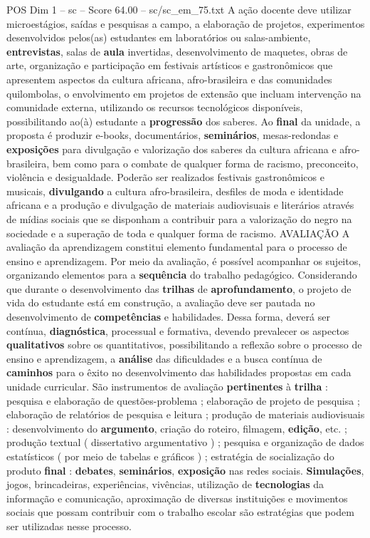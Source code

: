 \begin{textsample}{POS Dim 1 – sc – Score 64.00 – sc/sc\_em\_75.txt}
A ação docente deve utilizar microestágios, saídas e pesquisas a campo, a elaboração de projetos, experimentos desenvolvidos pelos(as) estudantes em laboratórios ou salas-ambiente, \textbf{entrevistas}, salas de \textbf{aula} invertidas, desenvolvimento de maquetes, obras de arte, organização e participação em festivais artísticos e gastronômicos que apresentem aspectos da cultura africana, afro-brasileira e das comunidades quilombolas, o envolvimento em projetos de extensão que incluam intervenção na comunidade externa, utilizando os recursos tecnológicos disponíveis, possibilitando ao(à) estudante a \textbf{progressão} dos saberes.
Ao \textbf{final} da unidade, a proposta é produzir e-books, documentários, \textbf{seminários}, mesas-redondas e \textbf{exposições} para divulgação e valorização dos saberes da cultura africana e afro-brasileira, bem como para o combate de qualquer forma de racismo, preconceito, violência e desigualdade.
Poderão ser realizados festivais gastronômicos e musicais, \textbf{divulgando} a cultura afro-brasileira, desfiles de moda e identidade africana e a produção e divulgação de materiais audiovisuais e literários através de mídias sociais que se disponham a contribuir para a valorização do negro na sociedade e a superação de toda e qualquer forma de racismo.
AVALIAÇÃO A avaliação da aprendizagem constitui elemento fundamental para o processo de ensino e aprendizagem.
Por meio da avaliação, é possível acompanhar os sujeitos, organizando elementos para a \textbf{sequência} do trabalho pedagógico.
Considerando que durante o desenvolvimento das \textbf{trilhas} de \textbf{aprofundamento}, o projeto de vida do estudante está em construção, a avaliação deve ser pautada no desenvolvimento de \textbf{competências} e habilidades.
Dessa forma, deverá ser contínua, \textbf{diagnóstica}, processual e formativa, devendo prevalecer os aspectos \textbf{qualitativos} sobre os quantitativos, possibilitando a reflexão sobre o processo de ensino e aprendizagem, a \textbf{análise} das dificuldades e a busca contínua de \textbf{caminhos} para o êxito no desenvolvimento das habilidades propostas em cada unidade curricular.
São instrumentos de avaliação \textbf{pertinentes} à \textbf{trilha} : pesquisa e elaboração de questões-problema ; elaboração de projeto de pesquisa ; elaboração de relatórios de pesquisa e leitura ; produção de materiais audiovisuais : desenvolvimento do \textbf{argumento}, criação do roteiro, filmagem, \textbf{edição}, etc. ; produção textual ( dissertativo argumentativo ) ; pesquisa e organização de dados estatísticos ( por meio de tabelas e gráficos ) ; estratégia de socialização do produto \textbf{final} : \textbf{debates}, \textbf{seminários}, \textbf{exposição} nas redes sociais. \textbf{Simulações}, jogos, brincadeiras, experiências, vivências, utilização de \textbf{tecnologias} da informação e comunicação, aproximação de diversas instituições e movimentos sociais que possam contribuir com o trabalho escolar são estratégias que podem ser utilizadas nesse processo.

\end{textsample}
